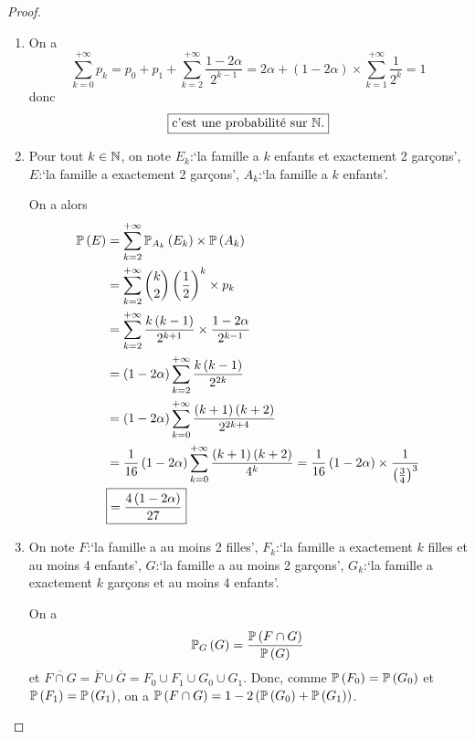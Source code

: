 \documentclass[12pt]{article}
\begin{document}
\begin{proof}
    \phantom{}
    \begin{enumerate}
        \item On a 
        \begin{equation}
            \sum_{k=0}^{+\infty}p_{k}=p_{0}+p_{1}+\sum_{k=2}^{+\infty}\frac{1-2\alpha}{2^{k-1}}=2\alpha+\left(1-2\alpha\right)\times\sum_{k=1}^{+\infty}\frac{1}{2^{k}}=1
        \end{equation}
        donc 
        \begin{equation}
            \boxed{\text{c'est une probabilité sur }\N.}
        \end{equation}

        \item Pour tout $k\in\N$, on note $E_{k}$:`la famille a $k$ enfants et exactement 2 garçons', $E$:`la famille a exactement 2 garçons', $A_{k}$:`la famille a $k$ enfants'.
        
        On a alors 
        \begin{align}
            \P\left(E\right)
            &=\sum_{k=2}^{+\infty}\P_{A_{k}}\left(E_{k}\right)\times\P\left(A_{k}\right)\\
            &=\sum_{k=2}^{+\infty}\binom{k}{2}\left(\frac{1}{2}\right)^{k}\times p_{k}\\
            &=\sum_{k=2}^{+\infty}\frac{k\left(k-1\right)}{2^{k+1}}\times\frac{1-2\alpha}{2^{k-1}}\\
            &=\left(1-2\alpha\right)\sum_{k=2}^{+\infty}\frac{k\left(k-1\right)}{2^{2k}}\\
            &=\left(1-2\alpha\right)\sum_{k=0}^{+\infty}\frac{\left(k+1\right)\left(k+2\right)}{2^{2k+4}}\\
            &=\frac{1}{16}\left(1-2\alpha\right)\sum_{k=0}^{+\infty}\frac{\left(k+1\right)\left(k+2\right)}{4^{k}}=\frac{1}{16}\left(1-2\alpha\right)\times\frac{1}{\left(\frac{3}{4}\right)^{3}}\\
            &\boxed{=\frac{4\left(1-2\alpha\right)}{27}}
        \end{align}

        \item On note $F$:`la famille a au moins 2 filles', $F_{k}$:`la famille a exactement $k$ filles et au moins 4 enfants', $G$:`la famille a au moins 2 garçons', $G_{k}$:`la famille a exactement $k$ garçons et au moins 4 enfants'.
        
        On a 
        \begin{equation}
            \P_{G}\left(G\right)=\frac{\P\left(F\cap G\right)}{\P\left(G\right)}
        \end{equation}
        et $\overline{F\cap G}=\overline{F}\cup\overline{G}=F_{0}\cup F_{1}\cup G_{0}\cup G_{1}$.
        Donc, comme $\P\left(F_{0}\right)=\P\left(G_{0}\right)$ et $\P\left(F_{1}\right)=\P\left(G_{1}\right)$, on a $\P\left(F\cap G\right)=1-2\left(\P\left(G_{0}\right)+\P\left(G_{1}\right)\right)$.


\end{enumerate}
\end{proof}
\end{document}
